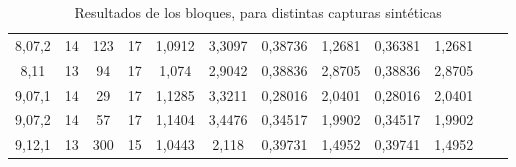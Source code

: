 \begin{table}[h]
\begin{tabular}{cccc|c|c|c|c|c|c|ll}
\multicolumn{1}{|c|}{8,07,2}  & \multicolumn{1}{c|}{14}         & \multicolumn{1}{c|}{123}    & 17      & 1,0912                                                  & 3,3097                                              & 0,38736                                                 & 1,2681
& 0,36381                                                 & 1,2681                                              &  &  \\ \cline{1-10}
\multicolumn{1}{|c|}{8,11}    & \multicolumn{1}{c|}{13}         & \multicolumn{1}{c|}{94}     & 17      & 1,074                                                   & 2,9042                                              & 0,38836                                                 & 2,8705                                              & 0,38836                                                 & 2,8705                                              &  &  \\ \cline{1-10}
\multicolumn{1}{|c|}{9,07,1}  & \multicolumn{1}{c|}{14}         & \multicolumn{1}{c|}{29}     & 17      & 1,1285                                                  & 3,3211                                              & 0,28016                                                 & 2,0401                                              & 0,28016                                                 & 2,0401                                              &  &  \\ \cline{1-10}
\multicolumn{1}{|c|}{9,07,2}  & \multicolumn{1}{c|}{14}         & \multicolumn{1}{c|}{57}     & 17      & 1,1404                                                  & 3,4476                                              & 0,34517                                                 & 1,9902                                              & 0,34517                                                 & 1,9902                                              &  &  \\ \cline{1-10}
\multicolumn{1}{|c|}{9,12,1}  & \multicolumn{1}{c|}{13}         & \multicolumn{1}{c|}{300}    & 15      & 1,0443                                                  & 2,118                                               & 0,39731                                                 & 1,4952                                              & 0,39741                                                 & 1,4952                                              &  &  \\ \cline{1-10}
\end{tabular}
\caption{Resultados de los bloques, para distintas capturas sintéticas}
\label{resultados_distintas_capturas}
\end{table}

